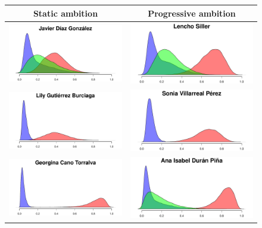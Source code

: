\documentclass[letter,12pt]{article}
\begin{document}
\begin{figure}
  \centering
  \begin{tabular}{cc}
    Static ambition & Progressive ambition \\ \hline
    \includegraphics[width=.3\columnwidth]{../graphs/prReconoce1.pdf} &
    \includegraphics[width=.3\columnwidth]{../graphs/prReconoce6.pdf} \\
    \includegraphics[width=.3\columnwidth]{../graphs/prReconoce2.pdf} &
    \includegraphics[width=.3\columnwidth]{../graphs/prReconoce5.pdf} \\
    \includegraphics[width=.3\columnwidth]{../graphs/prReconoce3.pdf} &
    \includegraphics[width=.3\columnwidth]{../graphs/prReconoce4.pdf} \\
  \end{tabular}
~ \\ ~ \\ ~ \\

\end{figure}
\end{document}

